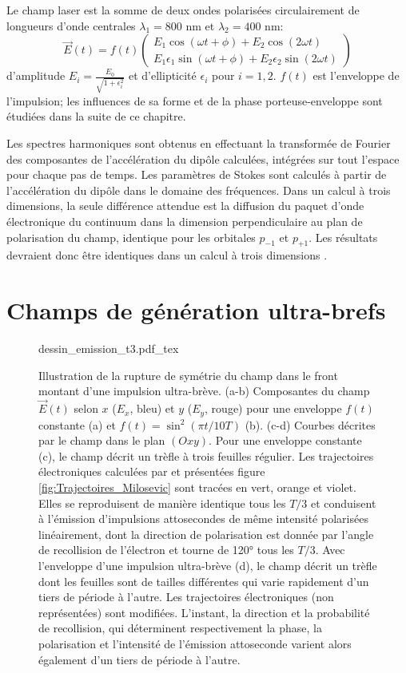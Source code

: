 Le champ laser est la somme de deux ondes polarisées circulairement de longueurs d'onde centrales $\lambda_1 = 800$ nm et $\lambda_2 = 400$ nm:
\begin{equation}
\vec{E}(t) = f(t) \begin{pmatrix}
E_1 \cos (\omega t + \phi) + E_2 \cos (2\omega t) \\
E_1 \epsilon_1 \sin (\omega t + \phi) + E_2 \epsilon_2 \sin (2\omega t)
\end{pmatrix}
\end{equation}
d'amplitude $E_i = \frac{E_0}{\sqrt{1 + \epsilon_i^2}}$ et d'ellipticité $\epsilon_i$ pour $i = 1,2$. $f(t)$ est l'enveloppe de l'impulsion; les influences de sa forme et de la phase porteuse-enveloppe sont étudiées dans la suite de ce chapitre.

Les spectres harmoniques sont obtenus en effectuant la transformée de Fourier des composantes de l'accélération du dipôle calculées, intégrées sur tout l'espace pour chaque pas de temps. Les paramètres de Stokes sont calculés à partir de l'accélération du dipôle dans le domaine des fréquences. Dans un calcul à trois dimensions, la seule différence attendue est la diffusion du paquet d'onde électronique du continuum dans la dimension perpendiculaire au plan de polarisation du champ, identique pour les orbitales $p_{-1}$ et $p_{+1}$. Les résultats devraient donc être identiques dans un calcul à trois dimensions .

\section{Champs de génération ultra-brefs}

\begin{figure}
\centering
\def\svgwidth{\textwidth}
{dessin_emission_t3.pdf_tex}
\caption{Illustration de la rupture de symétrie du champ dans le front montant d'une impulsion ultra-brève. (a-b) Composantes du champ $\vec{E}(t)$ selon $x$ ($E_x$, bleu) et $y$ ($E_y$, rouge) pour une enveloppe  $f(t)$ constante (a) et $f(t) = \sin^2 (\pi t / 10 T)$ (b). (c-d) Courbes décrites par le champ dans le plan $(Oxy)$. Pour une enveloppe constante (c), le champ décrit un trèfle à trois feuilles régulier. Les trajectoires électroniques calculées par  et présentées figure \ref{fig:Trajectoires_Milosevic} sont tracées en vert, orange et violet. Elles se reproduisent de manière identique tous les $T/3$ et conduisent à l'émission d'impulsions attosecondes de même intensité polarisées linéairement, dont la direction de polarisation est donnée par l'angle de recollision de l'électron et tourne de 120° tous les $T/3$. Avec l'enveloppe d'une impulsion ultra-brève (d), le champ décrit un trèfle dont les feuilles sont de tailles différentes qui varie rapidement d'un tiers de période à l'autre. Les trajectoires électroniques (non représentées) sont modifiées. L'instant, la direction et la probabilité de recollision, qui déterminent respectivement la phase, la polarisation et l'intensité de l'émission attoseconde varient alors également d'un tiers de période à l'autre.}
\label{fig:dessin_emission_t3}
\end{figure}

